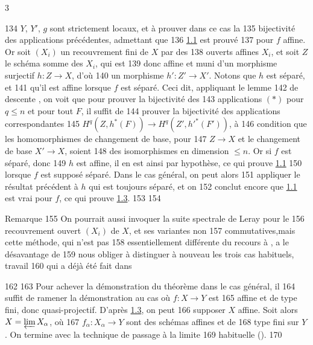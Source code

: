 3	\documentclass[10pt]{../fichiers-configuration-latex/smfart}
\begin{document}
   134	$Y$, $Y'$, $g$ sont strictement locaux, et à prouver dans ce cas la
   135	bijectivité des applications précédentes, admettant que
   136	\hyperref[XVI.thm1.1]{1.1} est prouvé 
   137	pour $f$ affine. Or soit $(X_i)$ un recouvrement fini de $X$ par des
   138	ouverts affines $X_i$, et soit $Z$ le schéma somme des $X_i$, qui est
   139	donc affine et muni d'un morphisme surjectif $h:Z\rightarrow X$, d'où
   140	un morphisme $h':Z'\rightarrow X'$. Notons que $h$ est séparé, et
   141	qu'il est affine lorsque $f$ est séparé. Ceci dit, appliquant le lemme
   142	de descente , on voit que pour prouver la bijectivité des
   143	applications $(\ast)$ pour $q\leq n$ et pour tout $F$, il suffit de
   144	prouver la bijectivité des applications correspondantes
   145	$H^{q}(Z,h^{\ast}(F))\rightarrow H^{q}(Z',{h'}^{\ast}(F'))$, à
   146	condition que les homomorphismes de changement de base, pour
   147	$Z\rightarrow X$ et le changement de base $X'\rightarrow X$, soient
   148	des isomorphismes en dimension $\leq n$. Or si $f$ est séparé, donc
   149	$h$ est affine, il en est ainsi par hypothèse, ce qui prouve \hyperref[XVI.thm1.1]{1.1}
   150	lorsque $f$ est supposé séparé. Dans le cas général, on peut alors
   151	appliquer le résultat précédent à $h$ qui est toujours séparé, et on
   152	conclut encore que \hyperref[XVI.thm1.1]{1.1} est vrai pour $f$, ce qui prouve \hyperref[XVI.lem1.3]{1.3}.
   153	
   154	\begin{enonce*}[remark]{Remarque}
   155	On pourrait aussi invoquer la suite spectrale de Leray pour le
   156	recouvrement ouvert $(X_i)$ de $X$, et ses variantes non
   157	commutatives,\pageoriginale mais cette méthode, qui n'est pas
   158	essentiellement différente du recours à , a le désavantage de
   159	nous obliger à distinguer à nouveau les trois cas habituels, travail
   160	qui a déjà été fait dans 	\end{enonce*}
   162	
   163	Pour achever la démonstration du théorème dans le cas général, il
   164	suffit de ramener la démonstration au cas où $f:X\rightarrow Y$ est
   165	affine et de type fini, donc quasi-projectif. D'après \hyperref[XVI.lem1.3]{1.3}, on peut
   166	supposer $X$ affine. Soit alors $X=\varprojlim X_{\alpha}$, où
   167	$f_{\alpha}:X_{\alpha}\rightarrow Y$ sont des schémas affines et de
   168	type fini sur $Y$. On termine avec la technique de passage à la limite
   169	habituelle ().
   170	
\end{document}
